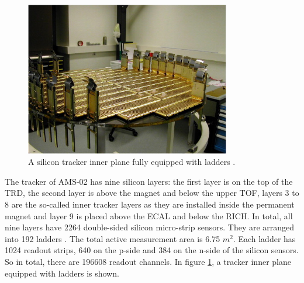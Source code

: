 

\begin{figure}[hbpt]
\centering
\includegraphics[width=0.8\textwidth, height=0.42\textheight ]{Figures/chapter3/Tracker/TrackerPlanePicture.jpg}
\caption[A silicon tracker inner plane fully equipped with ladders.]{A silicon tracker inner plane fully equipped with ladders \cite{TrackerPlanePicture}.}
\label{TrackerPlanePicture}
\end{figure}

The tracker of AMS-02 has nine silicon layers: the first layer is on the top of the TRD, the second layer is above the magnet and below the upper TOF, layers 3 to 8 are the so-called inner tracker layers as they are installed inside the permanent magnet and layer 9 is placed above the ECAL and below the RICH. In total, all nine layers have 2264 double-sided silicon micro-strip sensors. They are arranged into 192 ladders \cite{AMSTrackerPaper1, AMSTrackerPaper2}. The total active measurement area is 6.75 $m^2$. Each ladder has 1024 readout strips, 640 on the p-side and 384 on the n-side of the silicon sensors. So in total, there are 196608 readout channels. In figure \ref{TrackerPlanePicture}, a tracker inner plane equipped with ladders is shown.  \par 






